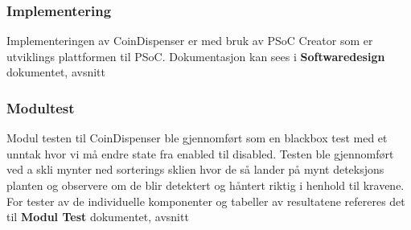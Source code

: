 \documentclass[Rapport/Rapport_main.tex]{subfiles}
\begin{document}
\subsubsection{Implementering}
Implementeringen av CoinDispenser er med bruk av PSoC Creator som er utviklings plattformen til PSoC. Dokumentasjon kan sees i \textbf{Softwaredesign} dokumentet, avsnitt 
\subsubsection{Modultest}
Modul testen til CoinDispenser ble gjennomført som en blackbox test med et unntak hvor vi må endre state fra enabled til disabled. Testen ble gjennomført ved a skli mynter ned sorterings sklien hvor de så lander på mynt deteksjons planten og observere om de blir detektert og håntert riktig i henhold til kravene. For tester av de individuelle komponenter og tabeller av resultatene refereres det til \textbf{Modul Test} dokumentet, avsnitt \\
\end{document}
